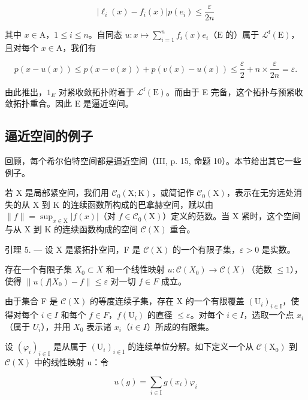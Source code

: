 \[
| \ell_ {i} (x) - f _ {i} (x) | p (e _ {i}) \leqslant \frac {\varepsilon}{2 n}
\]

其中 \(x \in \mathrm{A}\)，\(1 \leqslant i \leqslant n\)。自同态 \(u \colon x \mapsto \sum_{i=1}^{n} f_i(x)e_i\)（\(\mathrm{E}\) 的）属于 \(\mathcal{L}^{\mathrm{f}}(\mathrm{E})\)，且对每个 \(x \in \mathrm{A}\)，我们有

\[
p (x - u (x)) \leqslant p (x - v (x)) + p (v (x) - u (x)) \leqslant \frac {\varepsilon}{2} + n \times \frac {\varepsilon}{2 n} = \varepsilon .
\]

由此推出，\(1_{E}\) 对紧收敛拓扑附着于 \(\mathcal{L}^{\mathrm{f}}(\mathrm{E})\)。而由于 E 完备，这个拓扑与预紧收敛拓扑重合。因此 E 是逼近空间。

\subsection{逼近空间的例子}

回顾，每个希尔伯特空间都是逼近空间（III, p. 15, 命题 10）。本节给出其它一些例子。

若 X 是局部紧空间，我们用 \(\mathcal{C}_{0}(\mathrm{X};\mathrm{K})\)，或简记作 \(\mathcal{C}_{0}(\mathrm{X})\)，表示在无穷远处消失的从 X 到 K 的连续函数所构成的巴拿赫空间，赋以由 \(\|f\|=\sup_{x\in\mathrm{X}}|f(x)|\)（对 \(f\in\mathcal{C}_{0}(\mathrm{X})\)）定义的范数。当 X 紧时，这个空间与从 X 到 K 的连续函数构成的空间 \(\mathcal{C}(\mathrm{X})\) 重合。

引理 5. --- 设 X 是紧拓扑空间，F 是 \(\mathcal{C}(\mathrm{X})\) 的一个有限子集，\(\varepsilon > 0\) 是实数。

存在一个有限子集 \(X_{0} \subset X\) 和一个线性映射 \(u: \mathcal{C}(X_{0}) \to \mathcal{C}(X)\)（范数 \(\leqslant 1\)），使得 \(\|u(f|X_{0}) - f\| \leqslant \varepsilon\) 对一切 \(f \in F\) 成立。

由于集合 F 是 \(\mathcal{C}(\mathrm{X})\) 的等度连续子集，存在 X 的一个有限覆盖 \((\mathrm{U}_{i})_{i\in\mathrm{I}}\)，使得对每个 \(i\in I\) 和每个 \(f\in F\)，\(f(\mathrm{U}_{i})\) 的直径 \(\leqslant\varepsilon\)。对每个 \(i\in I\)，选取一个点 \(x_{i}\)（属于 \(U_{i}\)），并用 \(X_{0}\) 表示诸 \(x_{i}\)（\(i\in I\)）所成的有限集。

设 \((\varphi_{i})_{i\in\mathrm{I}}\) 是从属于 \((\mathrm{U}_{i})_{i\in\mathrm{I}}\) 的连续单位分解。如下定义一个从 \(\mathcal{C}(\mathrm{X}_{0})\) 到 \(\mathcal{C}(\mathrm{X})\) 中的线性映射 u：令

\[
u (g) = \sum_ {i \in \mathrm{I}} g (x _ {i}) \varphi_ {i}
\]

